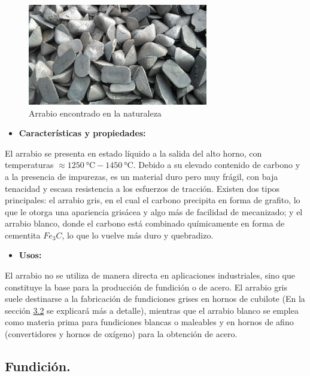 \documentclass[12pt,a4paper]{article}
\begin{document}
\begin{figure}[H]    
    \centering         
    \includegraphics[width=0.7\textwidth]{Inagenes para latex/1 Arrabio.jpg}
    \caption{Arrabio encontrado en la naturaleza}
\end{figure}

\begin{itemize}
    \item \textbf{Características y propiedades:}
\end{itemize}

El arrabio se presenta en estado líquido a la salida del alto horno, con temperaturas $\approx \SI{1250}{\celsius} - \SI{1450}{\celsius}$. Debido a su elevado contenido de carbono y a la presencia de impurezas, es un material duro pero muy frágil, con baja tenacidad y escasa resistencia a los esfuerzos de tracción. Existen dos tipos principales: el arrabio gris, en el cual el carbono precipita en forma de grafito, lo que le otorga una apariencia grisácea y algo más de facilidad de mecanizado; y el arrabio blanco, donde el carbono está combinado químicamente en forma de cementita $Fe_3C$, lo que lo vuelve más duro y quebradizo.

\begin{itemize}
    \item \textbf{Usos:}
\end{itemize}

El arrabio no se utiliza de manera directa en aplicaciones industriales, sino que constituye la base para la producción de fundición o de acero. El arrabio gris suele destinarse a la fabricación de fundiciones grises en hornos de cubilote (En la sección \hyperref[cubilote_seccion]{3.2} se explicará más a detalle), mientras que el arrabio blanco se emplea como materia prima para fundiciones blancas o maleables y en hornos de afino (convertidores y hornos de oxígeno) para la obtención de acero.

\subsection{Fundición.}
\end{document}
